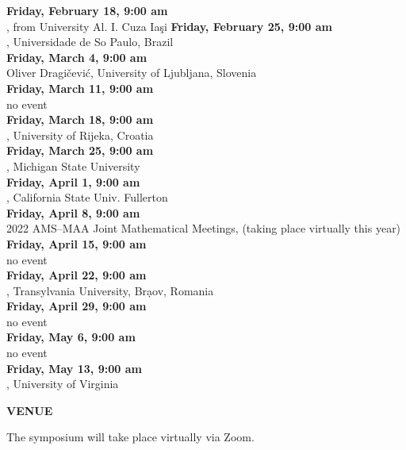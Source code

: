 \documentclass[a4paper]{article}
\begin{document}
\begin{minipage}{0.95\textwidth}
\begin{minipage}[b]{0.47\textwidth}
{\leavevmode \raggedright
\textbf{\color{cprimary} Friday, February 18, 9:00 am}\\ , from University Al. I. Cuza Ia\c{s}i
\textbf{\color{cprimary} Friday, February 25, 9:00 am}\\ , Universidade de So Paulo, Brazil\\
\textbf{\color{cprimary} Friday, March 4, 9:00 am}\\ Oliver Dragi\v{c}evi\'{c}, University of Ljubljana, Slovenia\\
\textbf{\color{cprimary} Friday, March 11, 9:00 am}\\ no event\\
\textbf{\color{cprimary} Friday, March 18, 9:00 am}\\ , University of Rijeka, Croatia\\
\textbf{\color{cprimary} Friday, March 25, 9:00 am}\\ , Michigan State University\\
\textbf{\color{cprimary} Friday, April 1, 9:00 am}\\ , California State Univ. Fullerton\\
\textbf{\color{cprimary} Friday, April 8, 9:00 am}\\ 2022 AMS--MAA Joint Mathematical Meetings, (taking place virtually this year)\\
\textbf{\color{cprimary} Friday, April 15, 9:00 am}\\ no event\\
\textbf{\color{cprimary} Friday, April 22, 9:00 am}\\ , Transylvania University, Br\d{a}ov, Romania\\
\textbf{\color{cprimary} Friday, April 29, 9:00 am}\\ no event\\
\textbf{\color{cprimary} Friday, May 6, 9:00 am}\\ no event\\
\textbf{\color{cprimary} Friday, May 13, 9:00 am}\\ , University of Virginia\\
\par{}
}

\vspace{0.1in}
\medskip

\large{\color{csecondary}\textbf{VENUE}}

The symposium will take place virtually via Zoom.


\end{minipage}
\end{minipage}
\end{document}
